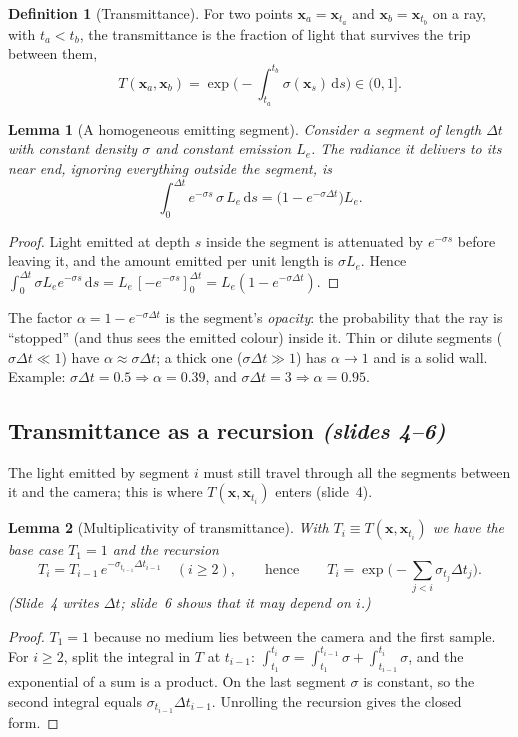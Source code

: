 \documentclass[11pt,a4paper]{article}
\newcommand{\xx}{\boldsymbol{x}}
\newcommand{\Le}{L_e}
\newcommand{\dif}{\,\mathrm{d}}
\newcommand{\sref}[1]{\texorpdfstring{\emph{(slides #1)}}{(slides #1)}}
\theoremstyle{definition}
\newtheorem{definition}{Definition}[section]
\theoremstyle{plain}
\newtheorem{lemma}{Lemma}[section]
\begin{document}
\begin{definition}[Transmittance]
For two points $\xx_a=\xx_{t_a}$ and $\xx_b=\xx_{t_b}$ on a ray, with $t_a<t_b$, the transmittance is the fraction of light that survives the trip between them,
\[
T(\xx_a,\xx_b)=\exp\!\Big(-\!\int_{t_a}^{t_b}\sigma(\xx_s)\dif s\Big)\in(0,1].
\]
\end{definition}

\begin{lemma}[A homogeneous emitting segment]\label{lem:segment}
Consider a segment of length $\Delta t$ with constant density $\sigma$ and constant emission $\Le$. The radiance it delivers to its near end, ignoring everything outside the segment, is
\[
\int_0^{\Delta t} e^{-\sigma s}\,\sigma\,\Le\dif s=\big(1-e^{-\sigma\Delta t}\big)\Le .
\]
\end{lemma}
\begin{proof}
Light emitted at depth $s$ inside the segment is attenuated by $e^{-\sigma s}$ before leaving it, and the amount emitted per unit length is $\sigma\Le$. Hence $\int_0^{\Delta t}\sigma\Le e^{-\sigma s}\dif s=\Le\,[-e^{-\sigma s}]_0^{\Delta t}=\Le(1-e^{-\sigma\Delta t})$.
\end{proof}

\begin{intuition}
The factor $\alpha=1-e^{-\sigma\Delta t}$ is the segment's \emph{opacity}: the probability that the ray is ``stopped'' (and thus sees the emitted colour) inside it. Thin or dilute segments ($\sigma\Delta t\ll1$) have $\alpha\approx\sigma\Delta t$; a thick one ($\sigma\Delta t\gg1$) has $\alpha\to1$ and is a solid wall. Example: $\sigma\Delta t=0.5\Rightarrow\alpha=0.39$, and $\sigma\Delta t=3\Rightarrow\alpha=0.95$.
\end{intuition}

\subsection{Transmittance as a recursion \sref{4--6}}

The light emitted by segment $i$ must still travel through all the segments between it and the camera; this is where $T(\xx,\xx_{t_i})$ enters (slide~4).

\begin{lemma}[Multiplicativity of transmittance]\label{lem:mult}
With $T_i\equiv T(\xx,\xx_{t_i})$ we have the base case $T_1=1$ and the recursion
\[
T_i=T_{i-1}\,e^{-\sigma_{t_{i-1}}\Delta t_{i-1}}\quad(i\ge2),\qquad\text{hence}\qquad T_i=\exp\!\Big(-\sum_{j<i}\sigma_{t_j}\Delta t_j\Big).
\]
(Slide~4 writes $\Delta t$; slide~6 shows that it may depend on $i$.)
\end{lemma}
\begin{proof}
$T_1=1$ because no medium lies between the camera and the first sample. For $i\ge2$, split the integral in $T$ at $t_{i-1}$: $\int_{t_1}^{t_i}\sigma=\int_{t_1}^{t_{i-1}}\sigma+\int_{t_{i-1}}^{t_i}\sigma$, and the exponential of a sum is a product. On the last segment $\sigma$ is constant, so the second integral equals $\sigma_{t_{i-1}}\Delta t_{i-1}$. Unrolling the recursion gives the closed form.
\end{proof}
\end{document}
